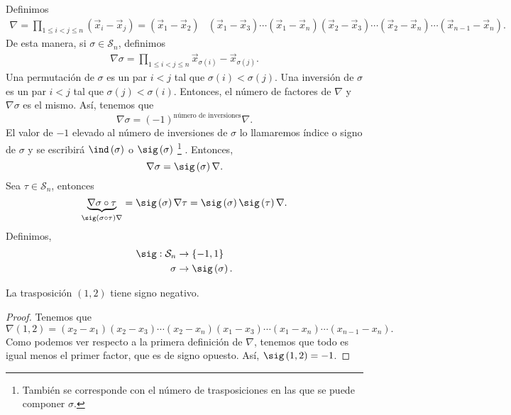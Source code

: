 Definimos 
\[
\begin{split}
	\nabla =  \prod_{1 \leq i < j \leq n} \left(\vec{x}_{i}-\vec{x}_{j}\right) = \left(\vec{x}_{1}-\vec{x}_{2}\right) &\left(\vec{x}_{1}-\vec{x}_{3}\right) \cdots \left(\vec{x}_{1}-\vec{x}_{n}\right) 
		  \left(\vec{x}_{2}-\vec{x}_{3}\right) \cdots \left(\vec{x}_{2}-\vec{x}_{n}\right) \cdots \left(\vec{x}_{n-1}-\vec{x}_{n}\right).
\end{split}
\]
De esta manera, si $\displaystyle \sigma \in \mathcal{S}_{n} $, definimos 
\[
\begin{split}
\nabla\sigma  = \prod_{1 \leq i < j \leq n}\vec{x}_{\sigma\left(i\right)}-\vec{x}_{\sigma\left(j\right)} .
\end{split}
\]
Una permutación de $\displaystyle \sigma  $ es un par $\displaystyle i < j $ tal que $\displaystyle \sigma\left(i\right) < \sigma\left(j\right) $. Una inversión de $\displaystyle \sigma  $ es un par $\displaystyle i < j $ tal que $\displaystyle \sigma\left(j\right) < \sigma\left(i\right) $. Entonces, el número de factores de $\displaystyle \nabla  $ y $\displaystyle \nabla \sigma 	 $ es el mismo. 
Así, tenemos que 
\[\nabla \sigma = \left(-1\right)^{\text{número de inversiones}} \nabla  .\]
El valor de $\displaystyle -1 $ elevado al número de inversiones de $\displaystyle \sigma  $ lo llamaremos índice o signo de $\displaystyle \sigma  $ y se escribirá $\displaystyle \ind\left(\sigma \right) $ o $\displaystyle \sig\left(\sigma \right) $ \footnote{También se corresponde con el número de trasposiciones en las que se puede componer $\displaystyle \sigma  $.} . Entonces, 
\[\nabla \sigma = \sig\left(\sigma \right) \nabla .\]
Sea $\displaystyle \tau \in \mathcal{S}_{n} $, entonces
\[\underbrace{\nabla \sigma \circ \tau}_{\sig\left(\sigma \circ \tau\right)\nabla } = \sig\left(\sigma \right)\nabla\tau = \sig\left(\sigma \right)\sig\left(\tau\right)\nabla .\]
Definimos,
\[
\begin{split}
	\sig : \mathcal{S}_{n} & \to \left\{ -1, 1\right\} \\
	 \sigma & \to \sig\left(\sigma\right).
\end{split}
\]
\begin{fprop}[]
\normalfont La trasposición $\displaystyle \left(1,2\right) $ tiene signo negativo.
\end{fprop}
\begin{proof}
Tenemos que 
\[\nabla\left(1,2\right) = \left(x_{2}-x_{1}\right) \left(x_{2}-x_{3}\right) \cdots \left(x_{2}-x_{n}\right) \left(x_{1}-x_{3}\right) \cdots \left(x_{1}-x_{n}\right) \cdots \left(x_{n-1} - x_{n}\right) .\]
Como podemos ver respecto a la primera definición de $\displaystyle \nabla  $, tenemos que todo es igual menos el primer factor, que es de signo opuesto. Así, $\displaystyle \sig\left(1,2\right) = -1 $.
\end{proof}

